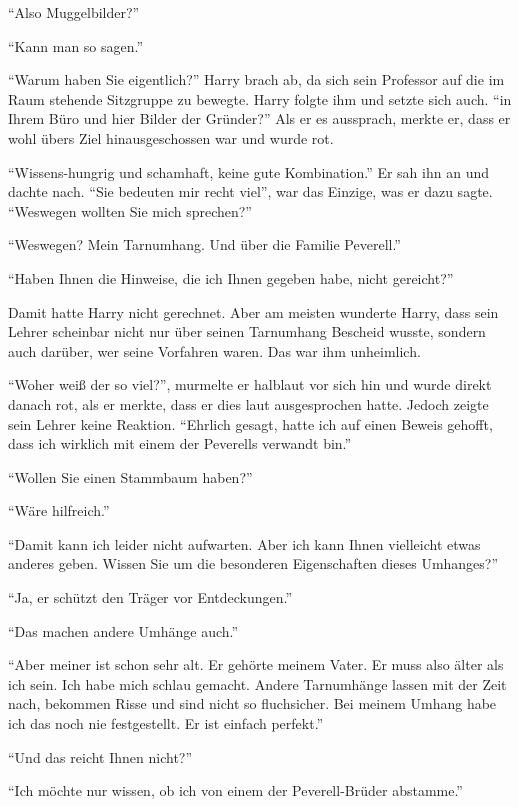 \enquote{Also Muggelbilder?}

\enquote{Kann man so sagen.}

\enquote{Warum haben Sie eigentlich\abs?} Harry brach ab, da sich sein Professor auf die im Raum stehende Sitzgruppe zu bewegte. Harry folgte ihm und setzte sich auch. \enquote{\aabs in Ihrem Büro und hier Bilder der Gründer?} Als er es aussprach, merkte er, dass er wohl übers Ziel hinausgeschossen war und wurde rot.

\enquote{Wissens-hungrig und schamhaft, keine gute Kombination.} Er sah ihn an und dachte nach. \enquote{Sie bedeuten mir recht viel}, war das Einzige, was er dazu sagte. \enquote{Weswegen wollten Sie mich sprechen?}

\enquote{Weswegen? \gst Mein Tarnumhang. Und über die Familie Peverell.}

\enquote{Haben Ihnen die Hinweise, die ich Ihnen gegeben habe, nicht gereicht?}

Damit hatte Harry nicht gerechnet. Aber am meisten wunderte Harry, dass sein Lehrer scheinbar nicht nur über seinen Tarnumhang Bescheid wusste, sondern auch darüber, wer seine Vorfahren waren. Das war ihm unheimlich.

\enquote{Woher weiß der so viel?}, murmelte er halblaut vor sich hin und wurde direkt danach rot, als er merkte, dass er dies laut ausgesprochen hatte. Jedoch zeigte sein Lehrer keine Reaktion. \enquote{Ehrlich gesagt, hatte ich auf einen Beweis gehofft, dass ich wirklich mit einem der Peverells verwandt bin.}

\enquote{Wollen Sie einen Stammbaum haben?}

\enquote{Wäre hilfreich.}

\enquote{Damit kann ich leider nicht aufwarten. Aber ich kann Ihnen vielleicht etwas anderes geben. Wissen Sie um die besonderen Eigenschaften dieses Umhanges?}

\enquote{Ja, er schützt den Träger vor Entdeckungen.}

\enquote{Das machen andere Umhänge auch.}

\enquote{Aber meiner ist schon sehr alt. Er gehörte meinem Vater. Er muss also älter als ich sein. Ich habe mich schlau gemacht. Andere Tarnumhänge lassen mit der Zeit nach, bekommen Risse und sind nicht so fluchsicher. Bei meinem Umhang habe ich das noch nie festgestellt. \gst Er ist einfach perfekt.}

\enquote{Und das reicht Ihnen nicht?}

\enquote{Ich möchte nur wissen, ob ich von einem der Peverell-Brüder abstamme.}

